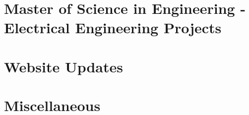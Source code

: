 \documentclass[a4paper,11pt,oneside]{book}
\begin{document}


























\section{Master of Science in Engineering - Electrical Engineering Projects}







\section{Website Updates}



\section{Miscellaneous}











\end{document}
